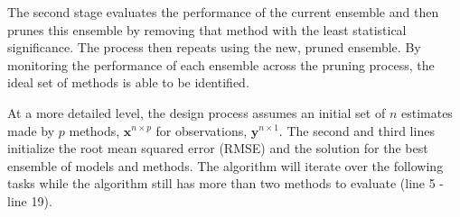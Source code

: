 \documentclass[journal=jpcbfk, manuscript=article]{achemso}
\newcommand{\+}[1]{\ensuremath{\mathbf{#1}}}
\begin{document}
The second stage evaluates the performance of the current ensemble and then prunes this ensemble by removing that method with the least statistical significance.
The process then repeats using the new, pruned ensemble.
By monitoring the performance of each ensemble across the pruning process, the ideal set of methods is able to be identified.

At a more detailed level, the design process assumes an initial set of $n$ estimates made by $p$ methods, $\textbf{x}^{n \times p}$ for observations, $\textbf{y}^{n \times 1}$.
The second and third lines initialize the root mean squared error (RMSE) and the solution for the best ensemble of models and methods.
The algorithm will iterate over the following tasks while the algorithm still has more than two methods to evaluate (line 5 - line 19).
\end{document}
